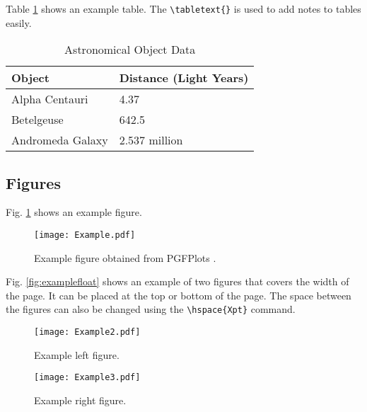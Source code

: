 \documentclass[9pt,a4paper,twocolumn,twoside]{tau-class/tau}
\begin{document}
        Table \ref{tab:table} shows an example table. The \verb|\tabletext{}| is used to add notes to tables easily. 
    		
        \begin{table}[H]
            \centering
            \caption{Astronomical Object Data}
            \label{tab:table}
            \begin{tabular}{ll}
                \toprule
                \textbf{Object} & \textbf{Distance (Light Years)} \\
                \midrule
                Alpha Centauri & 4.37 \\
                Betelgeuse & 642.5 \\
                Andromeda Galaxy & 2.537 million \\
                \bottomrule   
            \end{tabular}
			
			
        \end{table}

    \subsection{Figures}
		
    	Fig. \ref{fig:figure} shows an example figure.
    		
    	\begin{figure}[H]
    		\centering
    		\texttt{[image: Example.pdf]}
    		\caption{Example figure obtained from PGFPlots \cite{PFGPlots}.}
    		\label{fig:figure}
    	\end{figure}
		
        Fig. \ref{fig:examplefloat} shows an example of two figures that covers the width of the page. It can be placed at the top or bottom of the page. The space between the figures can also be changed using the \verb|\hspace{Xpt}| command.
		
        \begin{figure*}[tp] %
		\centering
		  \begin{subfigure}[b]{0.38\linewidth} %
			\texttt{[image: Example2.pdf]}
			\caption{Example left figure.}
			\label{fig:figa}
		\end{subfigure}
			\hspace{20pt}   %
		\begin{subfigure}[b]{0.375\linewidth} %
			\texttt{[image: Example3.pdf]}
			\caption{Example right figure.}
			\label{fig:figb}
		\end{subfigure}
		\caption{Example figure that covers the width of the page obtained from PGFPlots \cite{PFGPlots}.}
		\label{fig:examplefloat}
	\end{figure*}
		
\end{document}
